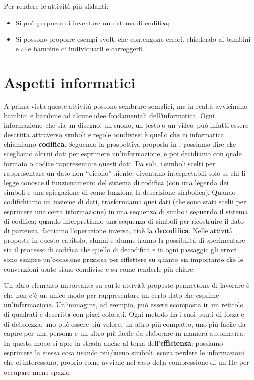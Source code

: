 Per rendere le attività più sfidanti:

\begin{itemize}
\item
  Si può proporre di inventare un sistema di codifica;
\item
  Si possono proporre esempi svolti che contengono errori, chiedendo ai bambini e alle bambine di individuarli e correggerli.
\end{itemize}

\section{Aspetti informatici }\label{aspetti-informatici-2}

A prima vista queste attività possono sembrare semplici, ma in realtà avvicinano bambini e bambine ad alcune idee fondamentali dell'informatica. Ogni informazione--che sia un disegno, un suono, un testo o un video--può infatti essere descritta attraverso simboli e regole condivise: è quello che in informatica chiamiamo \textbf{codifica}. Seguendo la prospettiva proposta in \textcite{lonati-monga-2025}, possiamo dire che scegliamo alcuni dati per esprimere un'informazione, e poi decidiamo con quale formato o codice rappresentare questi dati. Da soli, i simboli scelti per rappresentare un dato non ``dicono'' niente: diventano interpretabili solo se chi li legge conosce il funzionamento del sistema di codifica (con una legenda dei simboli e una spiegazione di come funziona la descrizione simbolica). Quando codifichiamo un insieme di dati, trasformiamo quei dati (che sono stati scelti per esprimere una certa informazione) in una sequenza di simboli seguendo il sistema di codifica; quando interpretiamo una sequenza di simboli per ricostruire il dato di partenza, facciamo l'operazione inversa, cioè la \textbf{decodifica}. Nelle attività proposte in questo capitolo, alunni e alunne hanno la possibilità di sperimentare sia il processo di codifica che quello di decodifica e in ogni passaggio gli errori sono sempre un'occasione preziosa per riflettere su quanto sia importante che le convenzioni usate siano condivise e su come renderle più chiare.

Un altro elemento importante su cui le attività proposte permettono di lavorare è che non c'è un unico modo per rappresentare un certo dato che esprime un'informazione. Un'immagine, ad esempio, può essere scomposta in un reticolo di quadrati e descritta con pixel colorati. Ogni metodo ha i suoi punti di forza e di debolezza: uno può essere più veloce, un altro più compatto, uno più facile da capire per una persona e un altro più facile da elaborare in maniera automatica. In questo modo si apre la strada anche al tema dell'\textbf{efficienza}: possiamo esprimere la stessa cosa usando più/meno simboli, senza perdere le informazioni che ci interessano, proprio come avviene nel caso della compressione di un file per occupare meno spazio.

